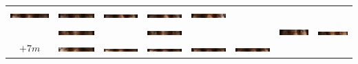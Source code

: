 \begin{tabular}{|c|c|c|c|c|c|c|c|}
\includegraphics[width=0.115\linewidth]{Auge1/A_Img8-3FalkoE.png} &
\includegraphics[width=0.115\linewidth]{Auge1/A_Img8-4FalkoE.png} &
\includegraphics[width=0.115\linewidth]{Auge1/A_Img8-5FalkoE.png} &
\includegraphics[width=0.115\linewidth]{Auge1/A_Img8-6FalkoE.png} &
\includegraphics[width=0.115\linewidth]{Auge1/A_Img8-7FalkoE.png} \\&
\includegraphics[width=0.115\linewidth]{Auge1/A_Img8-1ThomasE.png} &
&
\includegraphics[width=0.115\linewidth]{Auge1/A_Img8-3ThomasE.png} &
&
&
\includegraphics[width=0.115\linewidth]{Auge1/A_Img8-6ThomasE.png} &
\includegraphics[width=0.115\linewidth]{Auge1/A_Img8-7ThomasE.png} \\\hline 
$+7m$&
\includegraphics[width=0.115\linewidth]{Auge1/A_Img7-1FalkoE.png} &
\includegraphics[width=0.115\linewidth]{Auge1/A_Img7-2FalkoE.png} &
\includegraphics[width=0.115\linewidth]{Auge1/A_Img7-3FalkoE.png} &
\includegraphics[width=0.115\linewidth]{Auge1/A_Img7-4FalkoE.png} &
\includegraphics[width=0.115\linewidth]{Auge1/A_Img7-5FalkoE.png} &

\end{tabular}
